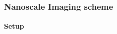 \documentclass[mathserif,16pt,xcolor=table]{beamer}
\begin{document}
  \begin{frame}[t]
    \frametitle{Nanoscale Imaging scheme}
    \framesubtitle{Setup}
    \begin{center}
      \begin{figure}[t!]
        \centering \vspace*{-.5cm}
        {\scalebox{.55}{}
        \label{fig:struct}}
      \end{figure}
    \end{center}
  \end{frame}

\end{document}
